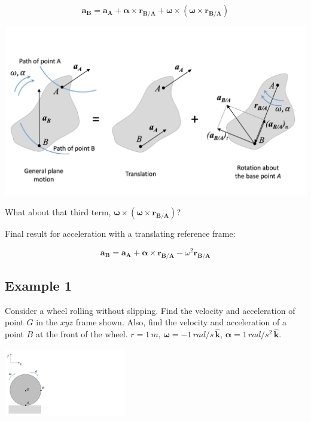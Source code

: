 \documentclass[12pt,letterpaper,twoside]{report}
\begin{document}
\vspace*{2\baselineskip}
\[
\bm{a_B} = \bm{a_A} + \bm{\alpha} \times \bm{r_{B/A}} + \bm{\omega} \times (\bm{\omega} \times \bm{r_{B/A}})
\]

\vspace*{1\baselineskip}
\raggedbottom
\newpage

\includegraphics[trim={0cm 0.5cm 0cm 2.5cm},clip,width=1\textwidth, center]{Slide27} 

\vspace*{8\baselineskip}
What about that third term, $\bm{\omega} \times (\bm{\omega} \times \bm{r_{B/A}})$?
\vspace*{12\baselineskip}

Final result for acceleration with a translating reference frame:

\[ \bm{a_B} = \bm{a_A} + \bm{\alpha} \times \bm{r_{B/A}} - \omega^2   \bm{r_{B/A}}
\]
\vspace*{2\baselineskip}

\subsection{Example 1}
Consider a wheel rolling without slipping.  Find the velocity and acceleration of point $G$ in the $xyz$ frame shown.  Also, find the velocity and acceleration of a point $B$ at the front of the wheel.  $r = 1 \, m$, $\bm{\omega} = -1 \, rad/s \, \bm{\hat{k}}$, $\bm{\alpha} = 1 \, rad/s^2 \, \bm{\hat{k}}$. 

\includegraphics[trim={0cm 0cm 15cm 0cm},clip,width=0.4\textwidth, left]{Slide28} 
\end{document}

